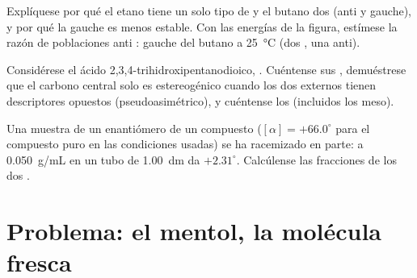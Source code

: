 \begin{exercise}[$\star\star\star$]\label{exo:b1:stereochemistry-in-depth:10}
Explíquese por qué el etano tiene un solo tipo de 
y el butano dos (anti y gauche), y por qué la gauche es menos estable.
Con las energías de la figura, estímese la razón de poblaciones anti :
gauche del butano a \qty{25}{\celsius} (dos , una
anti).
\end{exercise}

\begin{exercise}[$\star\star\star$]\label{exo:b1:stereochemistry-in-depth:11}
Considérese el ácido 2,3,4-trihidroxipentanodioico,
. Cuéntense sus , demuéstrese que el carbono central solo es estereogénico
cuando los dos externos tienen descriptores opuestos
(pseudoasimétrico), y cuéntense los  (incluidos los meso).
\end{exercise}

\begin{exercise}[$\star\star\star$]\label{exo:b1:stereochemistry-in-depth:12}
Una muestra de un enantiómero de un compuesto ($[\alpha] = +66.0^\circ$
para el compuesto puro en las condiciones usadas) se ha racemizado en
parte: a \qty{0.050}{g/mL} en un tubo de \qty{1.00}{dm} da $+2.31^\circ$.
Calcúlense las fracciones de los dos .
\end{exercise}

\section{Problema: el mentol, la molécula fresca}

